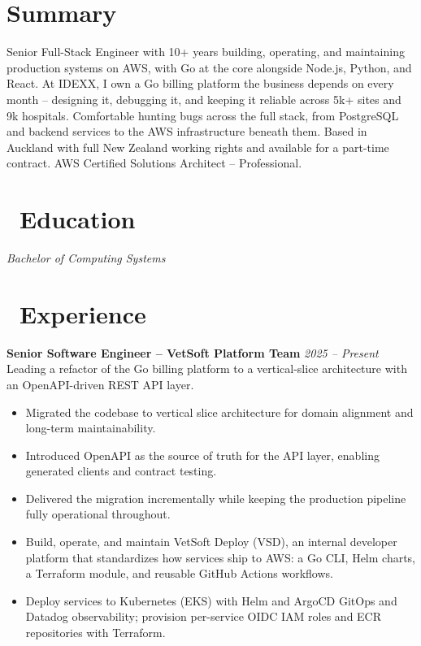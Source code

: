 \documentclass{resume}
\begin{document}


  \vspace{2em}

\section*{Summary}
Senior Full-Stack Engineer with 10+ years building, operating, and maintaining production systems on AWS, with Go at the core alongside Node.js, Python, and React. At IDEXX, I own a Go billing platform the business depends on every month -- designing it, debugging it, and keeping it reliable across 5k+ sites and 9k hospitals. Comfortable hunting bugs across the full stack, from PostgreSQL and backend services to the AWS infrastructure beneath them. Based in Auckland with full New Zealand working rights and available for a part-time contract. AWS Certified Solutions Architect -- Professional.

\section{\faGraduationCap\ Education}
\textit{Bachelor of Computing Systems}


\section{\faUsers\ Experience}
\vspace{1em}
\textbf{Senior Software Engineer -- VetSoft Platform Team} \hfill \textit{2025 -- Present} \\
Leading a refactor of the Go billing platform to a vertical-slice architecture with an OpenAPI-driven REST API layer.
\begin{itemize}
  \item Migrated the codebase to vertical slice architecture for domain alignment and long-term maintainability.
  \item Introduced OpenAPI as the source of truth for the API layer, enabling generated clients and contract testing.
  \item Delivered the migration incrementally while keeping the production pipeline fully operational throughout.
  \item Build, operate, and maintain VetSoft Deploy (VSD), an internal developer platform that standardizes how services ship to AWS: a Go CLI, Helm charts, a Terraform module, and reusable GitHub Actions workflows.
  \item Deploy services to Kubernetes (EKS) with Helm and ArgoCD GitOps and Datadog observability; provision per-service OIDC IAM roles and ECR repositories with Terraform.
\end{itemize}
\end{document}
